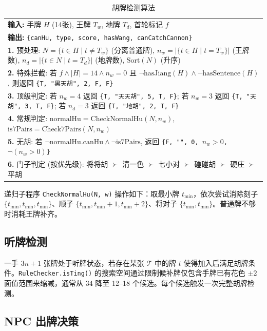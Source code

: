 \documentclass[11pt,a4paper]{article}
\begin{document}
\begin{table}[H]
\centering
\caption{胡牌检测算法}
\label{tab:algo_hu}
\small
\begin{tabular}{@{}p{}@{}}
\toprule
\textbf{输入:} 手牌 $H$ (14张), 王牌 $T_w$, 地牌 $T_d$, 首轮标记 $f$ \\
\textbf{输出:} \texttt{\{canHu, type, score, hasWang, canCatchCannon\}} \\
\midrule
\textbf{1.} 预处理: $N = \{t \in H \mid t \neq T_w\}$ (分离普通牌), $n_w = |\{t \in H \mid t = T_w\}|$ (王牌数), $n_d = |\{t \in N \mid t = T_d\}|$ (地牌数), $\text{Sort}(N)$ (升序) \\
\textbf{2.} 特殊拦截: 若 $f \land |H|=14 \land n_w=0$ 且 $\neg\text{hasJiang}(H) \land \neg\text{hasSentence}(H)$, 则返回 \texttt{\{T, "黑天胡", 2, F, F\}} \\
\textbf{3.} 顶级判定: 若 $n_w=4$ 返回 \texttt{\{T, "天天胡", 5, T, F\}}; 若 $n_w=3$ 返回 \texttt{\{T, "天胡", 3, T, F\}}; 若 $n_d=3$ 返回 \texttt{\{T, "地胡", 2, T, F\}} \\
\textbf{4.} 常规判定: $\text{normalHu} = \text{CheckNormalHu}(N, n_w)$, $\text{is7Pairs} = \text{Check7Pairs}(N, n_w)$ \\
\textbf{5.} 无胡: 若 $\neg\text{normalHu.canHu} \land \neg\text{is7Pairs}$, 返回 \texttt{\{F, "", 0, $n_w>0$, $\neg(n_w>0)$\}} \\
\textbf{6.} 门子判定 (按优先级): 将将胡 $\succ$ 清一色 $\succ$ 七小对 $\succ$ 碰碰胡 $\succ$ 硬庄 $\succ$ 平胡 \\
\bottomrule
\end{tabular}
\end{table}

递归子程序 \texttt{CheckNormalHu(N, w)} 操作如下：取最小牌 $t_{\min}$，依次尝试消除刻子 $\{t_{\min},t_{\min},t_{\min}\}$、顺子 $\{t_{\min},t_{\min}+1,t_{\min}+2\}$、将对子 $\{t_{\min},t_{\min}\}$。普通牌不够时消耗王牌补齐。

\subsection{听牌检测}

一手 $3n+1$ 张牌处于听牌状态，若存在某张 $\mathcal{T}$ 中的牌 $t$ 使得加入后满足胡牌条件。\texttt{RuleChecker.isTing()} 的搜索空间通过限制候补牌仅包含手牌已有花色 $\pm2$ 面值范围来缩减，通常从 34 降至 12--18 个候选。每个候选触发一次完整胡牌检测。

\subsection{NPC 出牌决策}
\end{document}
